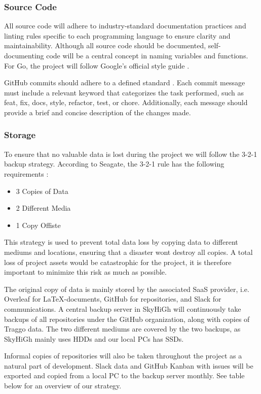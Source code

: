 \subsubsection{Source Code}  
All source code will adhere to industry-standard documentation practices and linting rules specific to each programming language to ensure clarity and maintainability. Although all source code should be documented, self-documenting code will be a central concept in naming variables and functions. For Go, the project will follow Google's official style guide \cite{google_go_style}. 

GitHub commits should adhere to a defined standard \cite{commit_standard}. Each commit message must include a relevant keyword that categorizes the task performed, such as feat, fix, docs, style, refactor, test, or chore. Additionally, each message should provide a brief and concise description of the changes made.

\subsubsection{Storage}

To ensure that no valuable data is lost during the project we will follow the 3-2-1 backup strategy. According to Seagate, the 3-2-1 rule has the following requirements \cite{3-2-1_data_storage}:

\begin{itemize}
    \item 3 Copies of Data
    \item 2 Different Media
    \item 1 Copy Offiste
\end{itemize}

This strategy is used to prevent total data loss by copying data to different mediums and locations, ensuring that a disaster wont destroy all copies. A total loss of project assets would be catastrophic for the project, it is therefore important to minimize this risk as much as possible. 

The original copy of data is mainly stored by the associated SaaS provider, i.e. Overleaf for \LaTeX-documents, GitHub for repositories, and Slack for communications. A central backup server in SkyHiGh will continuously take backups of all repositories under the GitHub organization, along with copies of Traggo data. The two different mediums are covered by the two backups, as SkyHiGh mainly uses HDDs and our local PCs has SSDs. 

Informal copies of repositories will also be taken throughout the project as a natural part of development. Slack data and GitHub Kanban with issues will be exported and copied from a local PC to the backup server monthly.
See table below for an overview of our strategy. 

